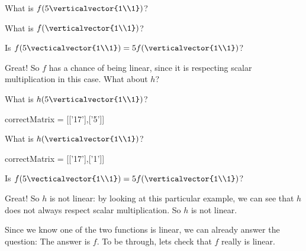 \documentclass{ximera}
\begin{document}
\begin{question}
\begin{solution}
\begin{hint}
	\begin{question}
		\begin{solution}
		 What is $f(5 \verticalvector{1\\1})$?
		\end{solution}
		\begin{solution}
		 What is $f(\verticalvector{1\\1})$?
		 \answer{3}
		\end{solution}
		\begin{solution}
			Is $f(5 \vecticalvector{1\\1}) = 5 f(\verticalvector{1\\1})$?
			\begin{multiple-choice}
			\choice[correct]{Yes}
			\choice{No}
			\end{multiple-choice}
		\end{solution}
		Great!  So $f$ has a chance of being linear, since it is respecting scalar multiplication in this case.
		What about $h$?
		\begin{solution}
		 What is $h(5 \verticalvector{1\\1})$?
		\begin{matrix-answer}[name=v]
    			  correctMatrix = [['17'],['5']]
   		 \end{matrix-answer}
		\end{solution}
		\begin{solution}
		 What is $h(\verticalvector{1\\1})$?
		 \begin{matrix-answer}[name=v]
    			  correctMatrix = [['17'],['1']]
   		 \end{matrix-answer}
		\end{solution}
		\begin{solution}
			Is $f(5 \vecticalvector{1\\1}) = 5 f(\verticalvector{1\\1})$?
			\begin{multiple-choice}
			\choice{Yes}
			\choice[correct]{No}
			\end{multiple-choice}
		\end{solution}
		Great!  So $h$ is not linear:  by looking at this particular example, we can see that $h$ does not always respect scalar multiplication.  So $h$ is not linear.
		
		Since we know one of the two functions is linear, we can already answer the question:  The answer is $f$.  To be through, lets check that $f$ really is linear.
		

\end{question}
\end{hint}
\end{solution}
\end{question}
\end{document}
